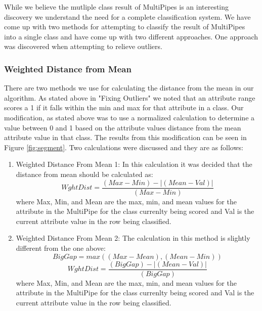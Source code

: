 While we believe the mutliple class result of MultiPipes is 
an interesting discovery we understand the need for a complete 
classification system. We have come up with two methods for
attempting to classify the result of MultiPipes into a single 
class and have come up with two different approaches. One 
approach was discovered when attempting to relieve outliers.
\subsubsection{Weighted Distance from Mean}
There are two methods we use for calculating the distance from 
the mean in our algorithm. As stated above in "Fixing Outliers" 
we noted that an attribute range scores a 1 if it falls within 
the min and max for that attribute in a class. Our modification, 
as stated above was to use a normalized calculation to determine 
a value between 0 and 1 based on the attribute values distance 
from the mean attribute value in that class. The results from this
 modification can be seen in Figure \ref{fig:segment}. Two 
calculations were discussed and they are as follows:
\begin{enumerate}
\item Weighted Distance From Mean 1: In this calculation it was 
decided that the distance from mean should be calculated as:
\begin{equation}
  WghtDist=\frac{(Max-Min)-|(Mean-Val)|}{(Max-Min)}
\end{equation}
where Max, Min, and Mean are the max, min, and mean values for 
the attribute in the MultiPipe for the class currenlty being 
scored and Val is the current attribute value in the row being 
classified. 
\item Weighted Distance From Mean 2: The calculation in this 
method is slightly different from the one above:
\begin{equation}
  BigGap = max((Max-Mean),(Mean-Min))
\end{equation}
\begin{equation}
  WghtDist=\frac{(BigGap)-|(Mean-Val)|}{(BigGap)}
\end{equation}
where Max, Min, and Mean are the max, min, and mean values for 
the attribute in the MultiPipe for the class currenlty being 
scored and Val is the current attribute value in the row being 
classified.
\end{enumerate}


